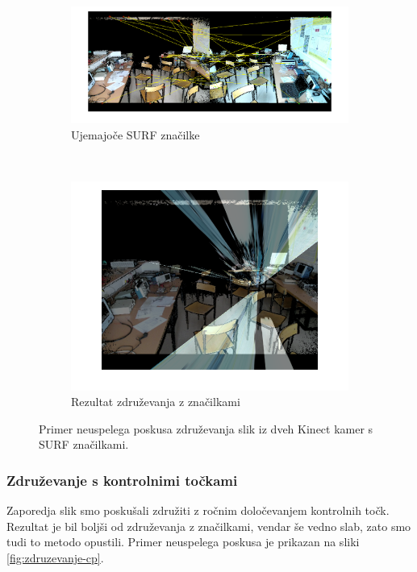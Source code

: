 \begin{figure}[htb]
\centering
\begin{subfigure}[t]{0.45\columnwidth}
\includegraphics[width=\columnwidth]{./Slike/matched-features.png}
\caption{Ujemajoče SURF značilke}
\label{fig:zdruzevanje-surf}
\end{subfigure}
~
\begin{subfigure}[t]{0.45\columnwidth}
\includegraphics[width=\columnwidth]{./Slike/features-calibration-result.png}
\caption{Rezultat združevanja z značilkami}
\label{fig:zdruzevanje-result}
\end{subfigure}
\caption{Primer neuspelega poskusa združevanja slik iz dveh Kinect kamer s SURF značilkami.}
\label{fig:zdruzevanje-znacilke}
\end{figure}

\subsubsection{Združevanje s kontrolnimi točkami}
Zaporedja slik smo poskušali združiti z ročnim določevanjem kontrolnih točk. Rezultat je bil boljši od združevanja z značilkami, vendar še vedno slab, zato smo tudi to metodo opustili. Primer neuspelega poskusa je prikazan na sliki \ref{fig:zdruzevanje-cp}.


